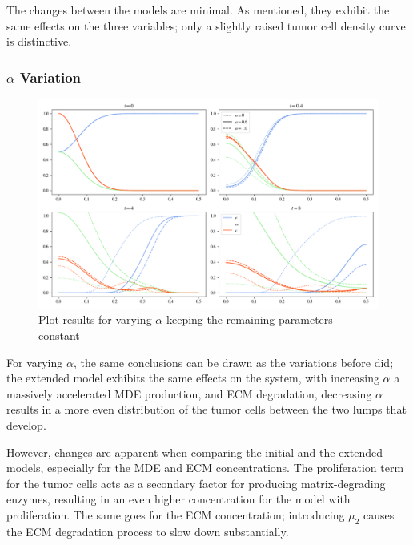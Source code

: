 The changes between the models are minimal. As mentioned, they exhibit the same effects on the three variables; only a slightly raised tumor cell density curve is distinctive.

\subsubsection*{$\alpha$ Variation}
\begin{figure}[h!]
    \centering
    \includegraphics[width=\textwidth]{resources/images/prolif_alpha_variation.png}
    \caption{Plot results for varying $\alpha$ keeping the remaining parameters constant}
    \label{fig:prolif_alpha_variation}
\end{figure}

For varying $\alpha$, the same conclusions can be drawn as the variations before did; the extended model exhibits the same effects on the system, with increasing $\alpha$ a massively accelerated MDE production, and ECM degradation, decreasing $\alpha$ results in a more even distribution of the tumor cells between the two lumps that develop. 

However, changes are apparent when comparing the initial and the extended models, especially for the MDE and ECM concentrations. The proliferation term for the tumor cells acts as a secondary factor for producing matrix-degrading enzymes, resulting in an even higher concentration for the model with proliferation. The same goes for the ECM concentration; introducing $\mu_2$ causes the ECM degradation process to slow down substantially. 

